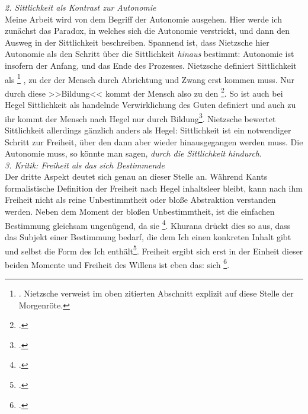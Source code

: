 \documentclass[12pt, a4paper, openany]{report}
\begin{document}
\emph{2. Sittlichkeit als Kontrast zur Autonomie}\\
Meine Arbeit wird von dem Begriff der Autonomie ausgehen. 
Hier werde ich zunächst das Paradox, in welches sich die Autonomie verstrickt, und dann den Ausweg in der Sittlichkeit beschreiben.
Spannend ist, dass Nietzsche hier Autonomie als den Schritt über die Sittlichkeit \emph{hinaus} bestimmt:
Autonomie ist insofern der Anfang, und das Ende des Prozesses.
Nietzsche definiert Sittlichkeit als %
\footnote{
    \cite[][22]{nietzsche_morgenrote_1999}. 
    Nietzsche verweist im oben zitierten Abschnitt explizit auf diese Stelle der Morgenröte.
}%
, zu der der Mensch durch Abrichtung und Zwang erst kommen muss.
Nur durch diese >>Bildung<< kommt der Mensch also zu den \footcite[][297]{nietzsche_jenseits_2014}. 
So ist auch bei Hegel Sittlichkeit als handelnde Verwirklichung des Guten definiert und auch zu ihr kommt der Mensch nach Hegel nur durch Bildung\footcite[Vergleiche dazu etwa:][§ 187 A, S. 191]{hegel_grundlinien_2017}.
Nietzsche bewertet Sittlichkeit allerdings gänzlich anders als Hegel:
Sittlichkeit ist ein notwendiger Schritt zur Freiheit, über den dann aber wieder hinausgegangen werden muss.
Die Autonomie muss, so könnte man sagen, \emph{durch die Sittlichkeit hindurch}.\\

\emph{3. Kritik: Freiheit als das sich Bestimmende}\\
Der dritte Aspekt deutet sich genau an dieser Stelle an. 
Während Kants formalistische Definition der Freiheit nach Hegel inhaltsleer bleibt, kann nach ihm Freiheit nicht als reine Unbestimmtheit oder bloße Abstraktion verstanden werden.
Neben dem Moment der bloßen Unbestimmtheit, ist die einfachen Bestimmung gleichsam ungenügend, da sie \footcite[][§ 6 A, S. 39]{hegel_grundlinien_2017}.
Khurana drückt dies so aus, dass das Subjekt einer Bestimmung bedarf, die dem Ich einen konkreten Inhalt gibt und selbst die Form des Ich enthält\footcite[Vgl.][285]{khurana_freiheit_2017}. 
Freiheit ergibt sich erst in der Einheit dieser beiden Momente und Freiheit des Willens ist eben das: sich \footcite[][§ 7, S. 40]{hegel_grundlinien_2017}.\\
\end{document}
